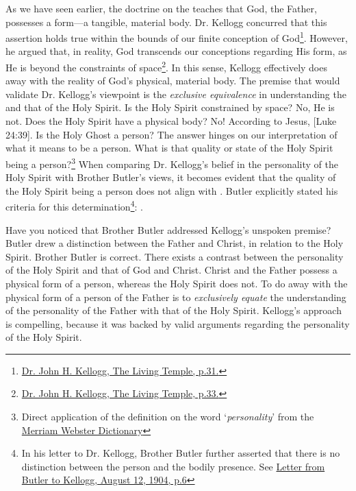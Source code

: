 As we have seen earlier, the doctrine on the  teaches that God, the Father, possesses a form—a tangible, material body. Dr. Kellogg concurred that this assertion holds true within the bounds of our finite conception of God\footnote{\href{https://archive.org/details/J.H.Kellogg.TheLivingTemple1903/page/n33/}{Dr. John H. Kellogg, The Living Temple, p.31.}}. However, he argued that, in reality, God transcends our conceptions regarding His form, as He is beyond the constraints of space\footnote{\href{https://archive.org/details/J.H.Kellogg.TheLivingTemple1903/page/n33/}{Dr. John H. Kellogg, The Living Temple, p.33.}}. In this sense, Kellogg effectively does away with the reality of God’s physical, material body. The premise that would validate Dr. Kellogg’s viewpoint is the \textit{exclusive equivalence} in understanding the  and that of the Holy Spirit. Is the Holy Spirit constrained by space? No, He is not. Does the Holy Spirit have a physical body? No! According to Jesus, [Luke 24:39]. Is the Holy Ghost a person? The answer hinges on our interpretation of what it means to be a person. What is that quality or state of the Holy Spirit being a person?\footnote{Direct application of the definition on the word ‘\textit{personality}’ from the \href{https://www.merriam-webster.com/dictionary/personality}{Merriam Webster Dictionary}} When comparing Dr. Kellogg's belief in the personality of the Holy Spirit with Brother Butler's views, it becomes evident that the quality of the Holy Spirit being a person does not align with . Butler explicitly stated his criteria for this determination\footnote{In his letter to Dr. Kellogg, Brother Butler further asserted that there is no distinction between the person and the bodily presence. See \href{https://c7da.us/egwdl/Butler\%20to\%20Kellogg\%20Aug121904.pdf}{Letter from Butler to Kellogg, August 12, 1904, p.6}}: .

Have you noticed that Brother Butler addressed Kellogg’s unspoken premise? Butler drew a distinction between the Father and Christ, in relation to the Holy Spirit. Brother Butler is correct. There exists a contrast between the personality of the Holy Spirit and that of God and Christ. Christ and the Father possess a physical form of a person, whereas the Holy Spirit does not. To do away with the physical form of a person of the Father is to \textit{exclusively equate} the understanding of the personality of the Father with that of the Holy Spirit. Kellogg’s approach is compelling, because it was backed by valid arguments regarding the personality of the Holy Spirit.

